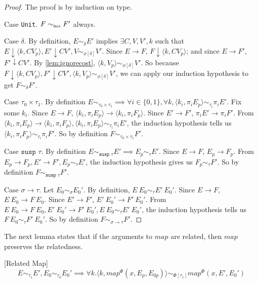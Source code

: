 \begin{proof}
  The proof is by induction on type.

  Case \texttt{Unit}.
  $F \sim_{\texttt{\tiny{Unit}}} F'$ always.

  Case $\delta$.
  By definition, $E \sim_\delta E'$ implies $\exists C, V, V', k$ such that $E \downarrow \langle k, C V_p \rangle, E' \downarrow C V', V \sim_{\phi[\delta]} V'$.
  Since $E \to F$, $F \downarrow \langle k, C V_p \rangle$; and since $E \to F'$, $F' \downarrow C V'$.
  By \ref{lem:ignorecost}, $\langle k, V_p \rangle \sim_{\phi[\delta]} V'$.
  So because $F \downarrow \langle k, C V_p \rangle, F' \downarrow C V', \langle k, V_p \rangle \sim_{\phi[\delta]} V'$, we can apply our induction hypothesis to get $F \sim_\delta F'$.

  Case $\tau_0 \times \tau_1$.
  By definition $E \sim_{\tau_0 \times \tau_1} \implies \forall i \in \{0, 1\}, \forall k, \langle k_i, \pi_i E_p \rangle \sim_{\tau_i} \pi_i E'$.
  Fix some $k_i$.
  Since $E \to F$, $\langle k_i, \pi_i E_p \rangle \to \langle k_i, \pi_i F_p \rangle$.
  Since $E' \to F'$, $\pi_i E' \to \pi_i F'$.
  From $\langle k_i, \pi_i E_p \rangle \to \langle k_i, \pi_i F_p \rangle, \langle k_i, \pi_i E_p \rangle \sim_{\tau_i} \pi_i E'$, the induction hypothesis tells us $\langle k_i, \pi_i F_p \rangle \sim_{\tau_i} \pi_i F'$.
  So by definition $F \sim_{\tau_0 \times \tau_1} F'$.

  Case $\texttt{susp } \tau$.
  By definition $E \sim_{\texttt{susp }\tau} E' \implies E_p \sim_\tau E'$.
  Since $E \to F$, $E_p \to F_p$.
  From $E_p \to F_p, E' \to F', E_p \sim_\tau E'$, the induction hypothesis gives us $F_p \sim_\tau F'$.
  So by definition $F \sim_{\texttt{susp }\tau} F'$.

  Case $\sigma \to \tau$.
  Let $E_0 \sim_\sigma E_0'$.
  By definition, $E\ E_0 \sim_\tau E'\ E_0'$.
  Since $E \to F$, $E\ E_0 \to F\ E_0$.
  Since $E' \to F'$, $E'\ E_0' \to F'\ E_0'$.
  From $E\ E_0 \to F\ E_0, E'\ E_0' \to F'\ E_0', E\ E_0 \sim_\tau E'\ E_0'$, the induction hypothesis tells us $F\ E_0 \sim_\tau F'\ E_0'$.
  So by definition $F \sim_{\sigma \to \tau} F'$.
\end{proof}
%
The next lemma states that if the arguments to $map$ are related, then $map$ preserves the relatedness.
%
\begin{lemma}
  \label{lem:relatedmap}[Related Map]
  \[ E \sim_{\tau_1} E', E_0 \sim_{\tau_0} E_0' \implies \forall k. \langle k, map^\Phi(x, E_p, E_{0p})\rangle \sim_{\Phi[\tau_1]} map^\Phi(x, E', E_0') \]
\end{lemma}
